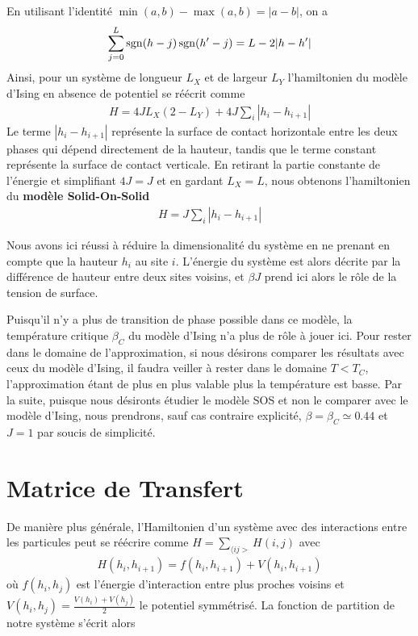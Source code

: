 En utilisant l'identité $\min(a,b)-\max(a,b)=|a-b|$, on a
\begin{align*}
    \sum_{j=0}^L \operatorname{sgn}(h-j)\operatorname{sgn}(h'-j) = L - 2 |h-h'|
\end{align*}
Ainsi, pour un système de longueur $L_X$ et de largeur $L_Y$ l'hamiltonien du modèle d'Ising en absence de potentiel se réécrit comme 
\begin{align}
    H = 4 J L_X (2-L_Y) +4J \sum_i |h_i-h_{i+1}|
\end{align}
Le terme $|h_i-h_{i+1}|$ représente la surface de contact horizontale entre les deux phases qui dépend directement de la hauteur, tandis que le terme constant représente la surface de contact verticale.
En retirant la partie constante de l'énergie et simplifiant $4 J = J$ et en gardant $L_X = L$, nous obtenons l'hamiltonien du \textbf{modèle Solid-On-Solid}
\begin{align}
    H = J \sum_i |h_i-h_{i+1}|
    \label{hamil-sos}
\end{align}

Nous avons ici réussi à réduire la dimensionalité du système en ne prenant en compte que la hauteur $h_i$ au site $i$. L'énergie du système est alors décrite par la différence de hauteur entre deux sites voisins, et $\beta J$ prend ici alors le rôle de la tension de surface.

Puisqu'il n'y a plus de transition de phase possible dans ce modèle, la température critique $\beta_C$ du modèle d'Ising n'a plus de rôle à jouer ici. Pour rester dans le domaine de l'approximation, si nous désirons comparer les résultats avec ceux du modèle d'Ising, il faudra veiller à rester dans le domaine $T \less T_C$, l'approximation étant de plus en plus valable plus la température est basse. Par la suite, puisque nous désironts étudier le modèle SOS et non le comparer avec le modèle d'Ising, nous prendrons, sauf cas contraire explicité, $\beta = \beta_C \simeq 0.44$ et $J=1$ par soucis de simplicité. 

  \section{Matrice de Transfert}

	De manière plus générale, l'Hamiltonien d'un système avec des interactions entre les particules peut se réécrire comme $H = \sum_{\langle ij >} H(i,j)$ avec
\begin{align*}
  H(h_i,h_{i+1}) = f(h_i,h_{i+1}) + V(h_i,h_{i+1}) 
\end{align*}
où $f(h_i,h_j)$ est l'énergie d'interaction entre plus proches voisins et $V(h_i,h_j)=\frac{V(h_i)+V(h_j)}{2}$ le potentiel symmétrisé.
La fonction de partition de notre système s'écrit alors 

